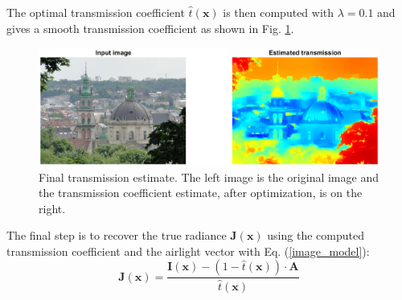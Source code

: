 \documentclass[conference]{IEEEtran}
\begin{document}
The optimal transmission coefficient $\hat{t}(\mathbf{x})$ is then computed with $\lambda = 0.1$ and gives a smooth transmission coefficient as shown in Fig. \ref{fig:final_transmission}. 
\begin{figure}
    \centering
    \includegraphics[width=\linewidth]{img/opti.png}
    \caption{Final transmission estimate.  The left image is the original image and the transmission coefficient estimate, after optimization, is on the right.}
    \label{fig:final_transmission}
\end{figure}
The final step is to recover the true radiance $\mathbf{J}(\mathbf{x})$ using the computed transmission coefficient and the airlight vector with Eq. (\ref{image_model}):
\begin{equation}
    \mathbf{J}(\mathbf{x}) = \frac{\mathbf{I}(\mathbf{x}) - (1 - \hat{t}(\mathbf{x})) \cdot \mathbf{A}}{\hat{t}(\mathbf{x})}
\end{equation}
\end{document}
